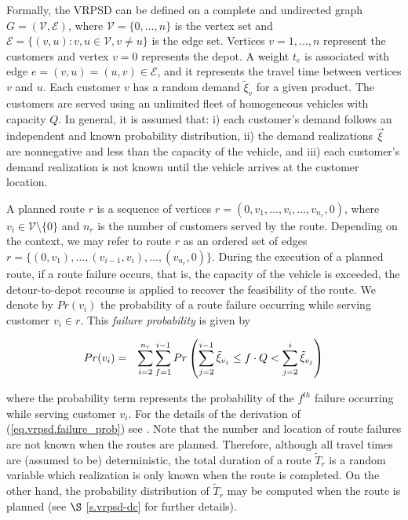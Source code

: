Formally, the VRPSD can be defined on a complete and undirected graph $G=(\mathcal{V},\mathcal{E})$, where $\mathcal{V}=\{0,\ldots,n\}$ is the vertex set and $\mathcal{E}=\{(v,u):v,u \in \mathcal{V},v\neq u \}$ is the edge set. Vertices $v=1,\ldots, n$ represent the customers and vertex $v=0$ represents the depot. A weight $t_{e}$ is associated with edge $e=(v,u)=(u,v)\in \mathcal{E}$, and it represents the travel time between vertices $v$ and $u$. Each customer $v$ has a random demand $\tilde{\xi}_{v}$ for a given product. The customers are served using an unlimited fleet of homogeneous vehicles with capacity $Q$. In general, it is assumed that: i) each customer's demand follows an independent and known probability distribution, ii) the demand realizations $\vec{\xi}$ are nonnegative and less than the capacity of the vehicle, and iii) each customer's demand realization is not known until the vehicle arrives at the customer location.

A planned route $r$ is a sequence of vertices $r=(0,v_{1},\ldots,v_{i},\ldots,v_{n_r},0)$, where $v_i \in \mathcal{V}\setminus \{0\}$ and $n_r$ is the number of customers served by the route. Depending on the context, we may refer to route $r$ as an ordered set of edges
$r=\{(0,v_{1}),\dots,(v_{i-1},v_{i}),\dots,(v_{n_{r}},0)\}$. During the execution of a planned route, if a route failure occurs, that is, the capacity of the vehicle is exceeded, the detour-to-depot recourse is applied to recover the feasibility of the route. We denote by $Pr(v_i)$ the probability of a route failure occurring while serving customer $v_i\in r$. This \emph{failure probability} is given by

\begin{eqnarray}
\small
Pr(v_i)&=&\sum_{i=2}^{n_{r}}\sum_{f=1}^{i-1}Pr\left(\sum_{j=2}^{i-1}\tilde{\xi}_{v_{j}}\leq f\cdot Q < \sum_{j=2}^{i}\tilde{\xi}_{v_{j}}\right)
\label{eq.vrpsd.failure_prob}
\end{eqnarray}

\noindent where the probability term represents the probability of the $f^{th}$ failure occurring while serving customer $v_{i}$. For the details of the derivation of (\ref{eq.vrpsd.failure_prob}) see \citep{Teodorovic1992}. Note that the number and location of route failures are not known when the routes are planned. Therefore, although all travel times are (assumed to be) deterministic, the total duration of a route $\tilde{T}_r$ is a random variable which realization is only known when the route is completed. On the other hand, the probability distribution of $\tilde{T}_r$ may be computed when the route is planned (see $\S$ \ref{s.vrpsd-dc} for further details).


